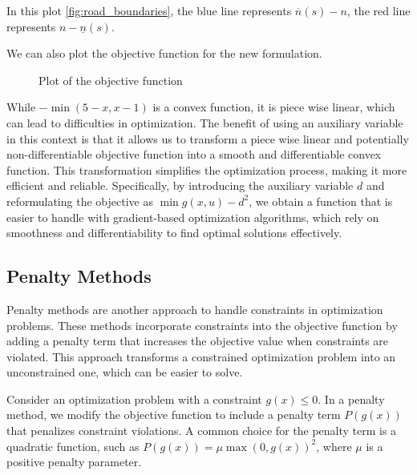 In this plot \ref{fig:road_boundaries}, the blue line represents \(\overline{n}(s) - n\), the red line represents \(n - \underline{n}(s)\).

We can also plot the objective function for the new formulation.

\begin{figure}[H]
	\centering
	\caption{Plot of the objective function}
	\label{fig:objective_functions}
\end{figure}

While \(-\min(5 - x, x - 1)\) is a convex function, it is piece wise linear, which can lead to difficulties in optimization.
The benefit of using an auxiliary variable in this context is that it allows us to transform a piece wise linear and potentially non-differentiable
objective function into a smooth and differentiable convex function.
This transformation simplifies the optimization process, making it more efficient and reliable.
Specifically, by introducing the auxiliary variable \( d \) and reformulating the objective as \(\min g(x, u) - d^2\), we obtain a function that is
easier to handle with gradient-based optimization algorithms, which rely on smoothness and differentiability to find optimal solutions effectively.

\subsection{Penalty Methods}

Penalty methods are another approach to handle constraints in optimization problems.
These methods incorporate constraints into the objective function by adding a penalty term that increases the objective value when constraints are
violated.
This approach transforms a constrained optimization problem into an unconstrained one, which can be easier to solve.

Consider an optimization problem with a constraint \( g(x) \leq 0 \).
In a penalty method, we modify the objective function to include a penalty term \( P(g(x)) \) that penalizes constraint violations.
A common choice for the penalty term is a quadratic function, such as \( P(g(x)) = \mu \max(0, g(x))^2 \), where \( \mu \) is a positive penalty
parameter.

